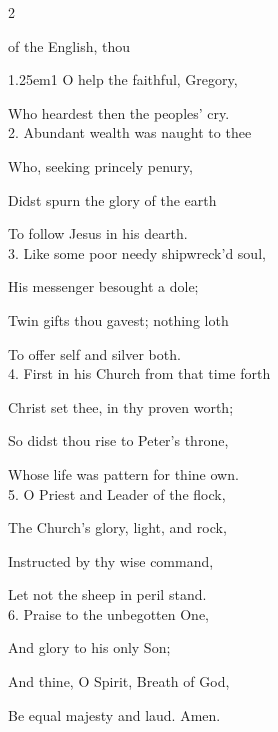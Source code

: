 \begin{paracol}{2}
\sloppy

\vspace{-1\baselineskip}

\firstEvensong\label{GregoryEvensong}

\firstEvensongHymn

 of the English, thou

\begin{hangparas}{1.25em}{1}
O help the faithful, Gregory,

Who heardest then the peoples' cry.\\

2. Abundant wealth was naught to thee

Who, seeking princely penury,

Didst spurn the glory of the earth

To follow Jesus in his dearth.\\

3. Like some poor needy shipwreck'd soul,

His messenger besought a dole;

Twin gifts thou gavest; nothing loth

To offer self and silver both.\\

4. First in his Church from that time forth

Christ set thee, in thy proven worth;

So didst thou rise to Peter's throne,

Whose life was pattern for thine own.\\

5. O Priest and Leader of the flock,

The Church's glory, light, and rock,

Instructed by thy wise command,

Let not the sheep in peril stand.\\

6. Praise to the unbegotten One,

And glory to his only Son;

And thine, O Spirit, Breath of God,

Be equal majesty and laud. Amen.\\
\end{hangparas}


\end{paracol}
